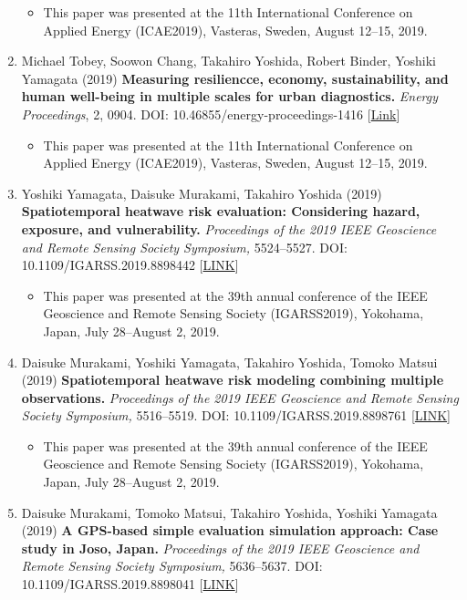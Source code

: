 \documentclass[
]{book}
\providecommand{\tightlist}{%
  \setlength{\itemsep}{0pt}\setlength{\parskip}{0pt}}
\begin{document}
\begin{enumerate}
  \begin{itemize}
  \tightlist
  \item
    This paper was presented at the 11th International Conference on Applied Energy (ICAE2019), Vasteras, Sweden, August 12--15, 2019.
  \end{itemize}
\item
  Michael Tobey, Soowon Chang, Takahiro Yoshida, Robert Binder, Yoshiki Yamagata (2019)
  \textbf{Measuring resiliencce, economy, sustainability, and human well-being in multiple scales for urban diagnostics.}
  \emph{Energy Proceedings}, 2, 0904.
  DOI: 10.46855/energy-proceedings-1416 {[}\href{https://doi.org/10.46855/energy-proceedings-1416}{Link}{]}

  \begin{itemize}
  \tightlist
  \item
    This paper was presented at the 11th International Conference on Applied Energy (ICAE2019), Vasteras, Sweden, August 12--15, 2019.
  \end{itemize}
\item
  Yoshiki Yamagata, Daisuke Murakami, Takahiro Yoshida (2019)
  \textbf{Spatiotemporal heatwave risk evaluation: Considering hazard, exposure, and vulnerability.}
  \emph{Proceedings of the 2019 IEEE Geoscience and Remote Sensing Society Symposium,} 5524--5527.
  DOI: 10.1109/IGARSS.2019.8898442 {[}\href{https://ieeexplore.ieee.org/document/8898442}{LINK}{]}

  \begin{itemize}
  \tightlist
  \item
    This paper was presented at the 39th annual conference of the IEEE Geoscience and Remote Sensing Society (IGARSS2019), Yokohama, Japan, July 28--August 2, 2019.
  \end{itemize}
\item
  Daisuke Murakami, Yoshiki Yamagata, Takahiro Yoshida, Tomoko Matsui (2019)
  \textbf{Spatiotemporal heatwave risk modeling combining multiple observations.}
  \emph{Proceedings of the 2019 IEEE Geoscience and Remote Sensing Society Symposium,} 5516--5519.
  DOI: 10.1109/IGARSS.2019.8898761 {[}\href{https://ieeexplore.ieee.org/document/8898761}{LINK}{]}

  \begin{itemize}
  \tightlist
  \item
    This paper was presented at the 39th annual conference of the IEEE Geoscience and Remote Sensing Society (IGARSS2019), Yokohama, Japan, July 28--August 2, 2019.
  \end{itemize}
\item
  Daisuke Murakami, Tomoko Matsui, Takahiro Yoshida, Yoshiki Yamagata (2019)
  \textbf{A GPS-based simple evaluation simulation approach: Case study in Joso, Japan.}
  \emph{Proceedings of the 2019 IEEE Geoscience and Remote Sensing Society Symposium,} 5636--5637.
  DOI: 10.1109/IGARSS.2019.8898041 {[}\href{https://ieeexplore.ieee.org/document/8898041}{LINK}{]}


\end{enumerate}
\end{document}

